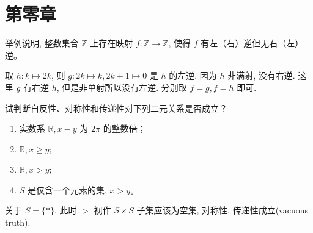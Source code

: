 \section{第零章}

\setcounter{pb}{3}
\begin{problem}
    举例说明, 整数集合 $ \mathbb{Z} $ 上存在映射 
    $ f\colon \mathbb{Z} \to \mathbb{Z} $, 使得 $ f $ 有左（右）逆但无右（左）逆。
\end{problem}

\begin{solution}
    取 $h\colon k \mapsto 2k$, 则 $g\colon 2k\mapsto k, 2k+1\mapsto 0$ 是 $h$ 的左逆. 
    因为 $h$ 非满射, 没有右逆. 这里 $g$ 有右逆 $h$, 但是非单射所以没有左逆. 分别取 $f=g, f=h$ 即可. 
\end{solution}

\begin{problem}
    试判断自反性、对称性和传递性对下列二元关系是否成立？
    \begin{enumerate}[label=(\roman*)]
        \item 实数系 $\mathbb{ R}, x - y $ 为 $ 2\pi $ 的整数倍；
        \item $\mathbb{ R}, x \geq y $;
        \item $\mathbb{ R}, x > y $;
        \item $ S $ 是仅含一个元素的集, $ x > y $。
    \end{enumerate}
\end{problem}

\begin{solution}
    关于 $S=\{\ast\}$, 此时 $>$ 视作 $S\times S$ 子集应该为空集, 对称性, 传递性成立(vacuous truth).
        \begin{table}[htbp]
            \caption{问题~}
        \end{table}

\end{solution}

